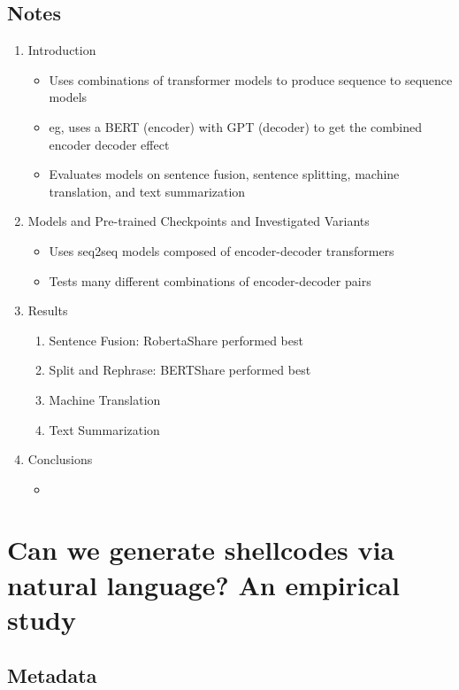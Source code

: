 \documentclass{article}
\begin{document}
\subsection*{Notes}

\begin{enumerate}
	\item Introduction
	\begin{itemize}
		\item Uses combinations of transformer models to produce sequence to sequence models
		\item eg, uses a BERT (encoder) with GPT (decoder) to get the combined encoder decoder effect
		\item Evaluates models on sentence fusion, sentence splitting, machine translation, and text summarization
	\end{itemize}
	\item Models and Pre-trained Checkpoints and Investigated Variants
	\begin{itemize}
		\item Uses seq2seq models composed of encoder-decoder transformers
		\item Tests many different combinations of encoder-decoder pairs
	\end{itemize}
	\item Results
	\begin{enumerate}
		\item Sentence Fusion: RobertaShare performed best
		\item Split and Rephrase: BERTShare performed best
		\item Machine Translation
		\item Text Summarization
	\end{enumerate}
	\item Conclusions
	\begin{itemize}
		\item 
	\end{itemize}
\end{enumerate}

\pagebreak


\section*{Can we generate shellcodes via natural language? An empirical study}

\subsection*{Metadata}
\end{document}
